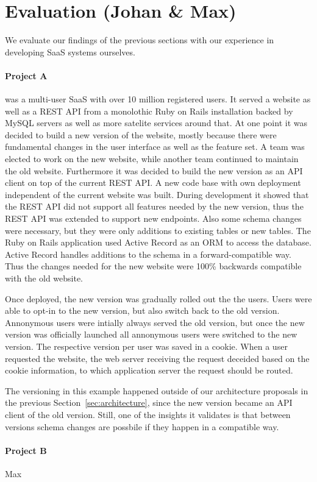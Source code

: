 \section{Evaluation (Johan \& Max)}

We evaluate our findings of the previous sections with our experience in developing SaaS systems ourselves.

\paragraph{Project A} was a multi-user SaaS with over 10 million registered users. It served a website as well as a REST API from a monolothic Ruby on Rails installation backed by MySQL servers as well as more satelite services around that. At one point it was decided to build a new version of the website, mostly because there were fundamental changes in the user interface as well as the feature set. A team was elected to work on the new website, while another team continued to maintain the old website. Furthermore it was decided to build the new version as an API client on top of the current REST API. A new code base with own deployment independent of the current website was built. During development it showed that the REST API did not support all features needed by the new version, thus the REST API was extended to support new endpoints. Also some schema changes were necessary, but they were only additions to existing tables or new tables. The Ruby on Rails application used Active Record as an ORM to access the database. Active Record handles additions to the schema in a forward-compatible way. Thus the changes needed for the new website were 100\% backwards compatible with the old website.

Once deployed, the new version was gradually rolled out the the users. Users were able to opt-in to the new version, but also switch back to the old version. Annonymous users were intially always served the old version, but once the new version was officially launched all annonymous users were switched to the new version. The respective version per user was saved in a cookie. When a user requested the website, the web server receiving the request deceided based on the cookie information, to which application server the request should be routed.

The versioning in this example happened outside of our architecture proposals in the previous Section~\ref{sec:architecture}, since the new version became an API client of the old version. Still, one of the insights it validates is that between versions schema changes are possbile if they happen in a compatible way.


\paragraph{Project B} Max

